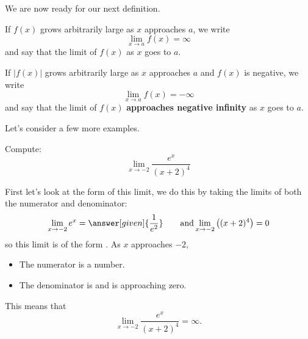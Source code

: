 \documentclass{ximera}
\begin{document}
We are now ready for our next definition.

\begin{definition}
If $f(x)$ grows arbitrarily large as $x$ approaches $a$, we write
\[
\lim_{x\to a} f(x) = \infty
\]
and say that the limit of $f(x)$  as $x$
goes to $a$.

If $|f(x)|$ grows arbitrarily large as $x$ approaches $a$ and $f(x)$ is
negative, we write
\[
\lim_{x\to a} f(x) = -\infty
\]
and say that the limit of $f(x)$ \textbf{approaches negative infinity}
as $x$ goes to $a$.
\end{definition}

Let's consider a few more examples.

\begin{example}
  Compute:
  \[
  \lim_{x\to -2} \frac{e^x}{(x+2)^4}
  \]
  \begin{explanation}
    First let's look at the form of this limit, we do this by taking the limits of both the numerator and denominator:
    \[
    \lim_{x\to -2} e^x = \answer[given]{\frac{1}{e^2}}\qquad\text{and}\lim_{x\to-2}\left((x+2)^4\right) = 0
    \]
    so this limit is of the form \numOverZero.  As $x$ approaches $-2$,
    \begin{itemize}
    \item The numerator is a  number. 
    \item The denominator is  and is approaching zero.
    \end{itemize}
    This means that
    \[
    \lim_{x\to -2} \frac{e^x}{(x+2)^4} = \infty.
    \]
  \end{explanation}
\end{example}
\end{document}
